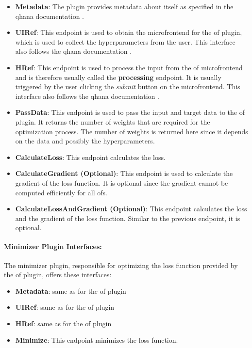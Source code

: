 \documentclass[
  a4paper,  %
  twoside,  %
  bibliography=totoc,
  headsepline,
  cleardoublepage=empty,
  parskip=half,
  draft=false
]{scrbook}
\begin{document}
\begin{itemize}
\item \textbf{Metadata}: The plugin provides metadata about itself as specified in the \gls{qhana} documentation \cite{FabianBuehler}.
\item \textbf{UIRef}: This endpoint is used to obtain the microfrontend for the \gls{of} plugin, which is used to collect the hyperparameters from the user.
This interface also follows the \gls{qhana} documentation \cite{FabianBuehler}.
\item \textbf{HRef}: This endpoint is used to process the input from the \gls{of} microfrontend and is therefore usually called the \textbf{processing} endpoint.
It is usually triggered by the user clicking the \emph{submit} button on the microfrontend.
This interface also follows the \gls{qhana} documentation \cite{FabianBuehler}.
\item \textbf{PassData}: This endpoint is used to pass the input and target data to the \gls{of} plugin.
It returns the number of weights that are required for the optimization process.
The number of weights is returned here since it depends on the data and possibly the hyperparameters.
\item \textbf{CalculateLoss}: This endpoint calculates the loss.
\item \textbf{CalculateGradient (Optional)}: This endpoint is used to calculate the gradient of the loss function. It is optional since the gradient cannot be computed efficiently for all \glspl{of}.
\item \textbf{CalculateLossAndGradient (Optional)}: This endpoint calculates the loss and the gradient of the loss function. Similar to the previous endpoint, it is optional.
\end{itemize}

\paragraph{Minimizer Plugin Interfaces:}

The minimizer plugin, responsible for optimizing the loss function provided by the \gls{of} plugin, offers these interfaces:

\begin{itemize}
  \item \textbf{Metadata}: same as for the \gls{of} plugin
  \item \textbf{UIRef}: same as for the \gls{of} plugin
  \item \textbf{HRef}: same as for the \gls{of} plugin
  \item \textbf{Minimize}: This endpoint minimizes the loss function.
\end{itemize}
\end{document}
